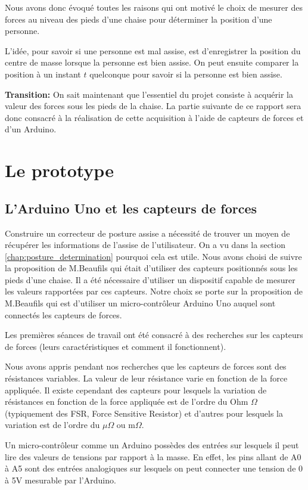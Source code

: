 \documentclass{polytech/polytech}
\begin{document}
Nous avons donc évoqué toutes les raisons qui ont motivé le choix de mesurer des forces au niveau des pieds d'une chaise pour déterminer la position d'une personne.

L'idée, pour savoir si une personne est mal assise, est d'enregistrer la position du centre de masse lorsque la personne est bien assise. On peut ensuite comparer la position à un instant $t$ quelconque pour savoir si la personne est bien assise.

\textbf{Transition:} On sait maintenant que l'essentiel du projet consiste à acquérir la valeur des forces sous les pieds de la chaise. La partie suivante de ce rapport sera donc consacré à la réalisation de cette acquisition à l'aide de capteurs de forces et d'un Arduino.

\section{Le prototype}
\label{chap:arduino}

\subsection{L'Arduino Uno et les capteurs de forces}
Construire un correcteur de posture assise a nécessité de trouver un moyen de récupérer les informations de l'assise de l'utilisateur. On a vu dans la section \ref{chap:posture_determination} pourquoi cela est utile. Nous avons choisi de suivre la proposition de M.Beaufils qui était d'utiliser des capteurs positionnés sous les pieds d'une chaise. Il a été nécessaire d'utiliser un dispositif capable de mesurer les valeurs rapportées par ces capteurs. Notre choix se porte sur la proposition de M.Beaufils qui est d'utiliser un  micro-contrôleur Arduino Uno auquel sont connectés les capteurs de forces. 

Les premières séances de travail ont été consacré à des recherches sur les capteurs de forces (leurs caractéristiques et comment il fonctionnent). 

Nous avons appris pendant nos recherches que les capteurs de forces sont des résistances variables. La valeur de leur résistance varie en fonction de la force appliquée. Il existe cependant des capteurs pour lesquels la variation de résistances en fonction de la force appliquée est de l'ordre du Ohm $\Omega$ (typiquement des FSR, Force Sensitive Resistor) et d'autres pour lesquels la variation est de l'ordre du $\mu \Omega$ ou $\mathrm{m} \Omega$.

Un micro-contrôleur comme un Arduino possèdes des entrées sur lesquels il peut lire des valeurs de tensions par rapport à la masse. En effet, les pins allant de A0 à A5 sont des entrées analogiques sur lesquels on peut connecter une tension de 0 à 5V mesurable par l'Arduino. 
\end{document}
